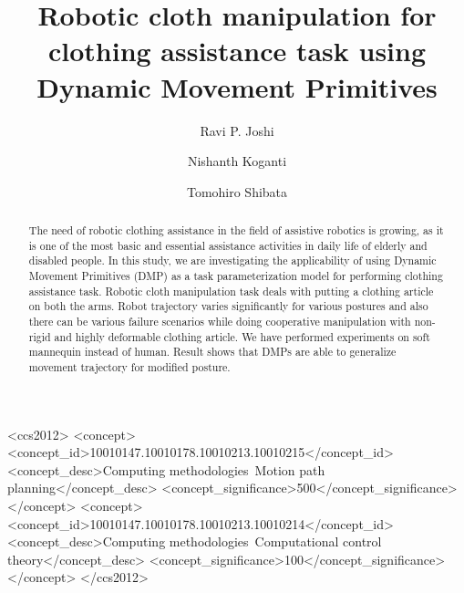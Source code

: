 \documentclass[sigconf]{acmart}
\begin{document}
\title{Robotic cloth manipulation for clothing assistance task using Dynamic Movement
Primitives}

\author{Ravi P. Joshi}
\affiliation{}

\author{Nishanth Koganti}
\affiliation{}

\author{Tomohiro Shibata}
\affiliation{}

\graphicspath{{./images/}}

\begin{abstract}
	The need of robotic clothing assistance in the field of assistive robotics is growing, as it is one of the most basic and essential assistance activities in daily life of elderly and disabled people. In this study, we are investigating the applicability of using Dynamic Movement Primitives (DMP) as a task parameterization model for performing clothing assistance task. Robotic cloth manipulation task deals with putting a clothing article on both the arms. Robot trajectory varies significantly for various postures and also there can be various failure scenarios while doing cooperative manipulation with non-rigid and highly deformable clothing article. We have performed experiments on soft mannequin instead of human. Result shows that DMPs are able to generalize movement trajectory for modified posture.
\end{abstract}

\begin{CCSXML}
	<ccs2012>
	<concept>
	<concept_id>10010147.10010178.10010213.10010215</concept_id>
	<concept_desc>Computing methodologies~Motion path planning</concept_desc>
	<concept_significance>500</concept_significance>
	</concept>
	<concept>
	<concept_id>10010147.10010178.10010213.10010214</concept_id>
	<concept_desc>Computing methodologies~Computational control theory</concept_desc>
	<concept_significance>100</concept_significance>
	</concept>
	</ccs2012>
\end{CCSXML}
\end{document}
